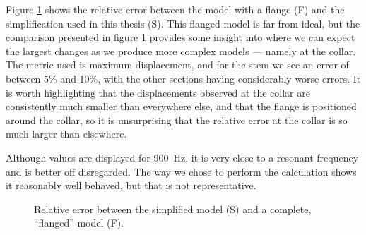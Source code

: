 Figure \ref{fig:error-compared-to-flanged} shows the relative error between the model with a flange (F) and the simplification used in this thesis (S).
This flanged model is far from ideal, but the comparison presented in figure \ref{fig:error-compared-to-flanged} provides some insight into where we can expect the largest changes as we produce more complex models --- namely at the collar.
The metric used is maximum displacement, and for the stem we see an error of between 5\% and 10\%, with the other sections having considerably worse errors.
It is worth highlighting that the displacements observed at the collar are consistently much smaller than everywhere else, and that the flange is positioned around the collar, so it is unsurprising that the relative error at the collar is so much larger than elsewhere.

Although values are displayed for \SI{900}{Hz}, it is very close to a resonant frequency and is better off disregarded.
The way we chose to perform the calculation shows it reasonably well behaved, but that is not representative. 

\begin{figure}\centering
    \caption[Relative error between complete and simplified ITAP model]{Relative error between the simplified model (S) and a complete, ``flanged'' model (F).}
    \label{fig:error-compared-to-flanged}
\end{figure}